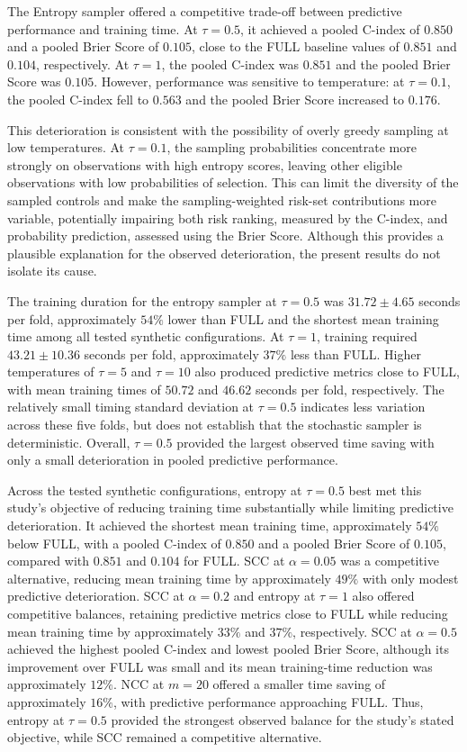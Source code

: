 \documentclass[a4paper,twoside,12pt]{report}
\begin{document}
The Entropy sampler offered a competitive trade-off between predictive performance and training time. At $\tau=0.5$, it achieved a pooled C-index of $0.850$ and a pooled Brier Score of $0.105$, close to the FULL baseline values of $0.851$ and $0.104$, respectively. At $\tau=1$, the pooled C-index was $0.851$ and the pooled Brier Score was $0.105$. However, performance was sensitive to temperature: at $\tau=0.1$, the pooled C-index fell to $0.563$ and the pooled Brier Score increased to $0.176$.

This deterioration is consistent with the possibility of overly greedy sampling at low temperatures. At $\tau=0.1$, the sampling probabilities concentrate more strongly on observations with high entropy scores, leaving other eligible observations with low probabilities of selection. This can limit the diversity of the sampled controls and make the sampling-weighted risk-set contributions more variable, potentially impairing both risk ranking, measured by the C-index, and probability prediction, assessed using the Brier Score. Although this provides a plausible explanation for the observed deterioration, the present results do not isolate its cause.

The training duration for the entropy sampler at $\tau=0.5$ was $31.72 \pm 4.65$ seconds per fold, approximately $54\%$ lower than FULL and the shortest mean training time among all tested synthetic configurations. At $\tau=1$, training required $43.21 \pm 10.36$ seconds per fold, approximately $37\%$ less than FULL. Higher temperatures of $\tau=5$ and $\tau=10$ also produced predictive metrics close to FULL, with mean training times of $50.72$ and $46.62$ seconds per fold, respectively. The relatively small timing standard deviation at $\tau=0.5$ indicates less variation across these five folds, but does not establish that the stochastic sampler is deterministic. Overall, $\tau=0.5$ provided the largest observed time saving with only a small deterioration in pooled predictive performance.

Across the tested synthetic configurations, entropy at $\tau=0.5$ best met this study's objective of reducing training time substantially while limiting predictive deterioration. It achieved the shortest mean training time, approximately $54\%$ below FULL, with a pooled C-index of $0.850$ and a pooled Brier Score of $0.105$, compared with $0.851$ and $0.104$ for FULL. SCC at $\alpha=0.05$ was a competitive alternative, reducing mean training time by approximately $49\%$ with only modest predictive deterioration. SCC at $\alpha=0.2$ and entropy at $\tau=1$ also offered competitive balances, retaining predictive metrics close to FULL while reducing mean training time by approximately $33\%$ and $37\%$, respectively. SCC at $\alpha=0.5$ achieved the highest pooled C-index and lowest pooled Brier Score, although its improvement over FULL was small and its mean training-time reduction was approximately $12\%$. NCC at $m=20$ offered a smaller time saving of approximately $16\%$, with predictive performance approaching FULL. Thus, entropy at $\tau=0.5$ provided the strongest observed balance for the study's stated objective, while SCC remained a competitive alternative.
\end{document}
